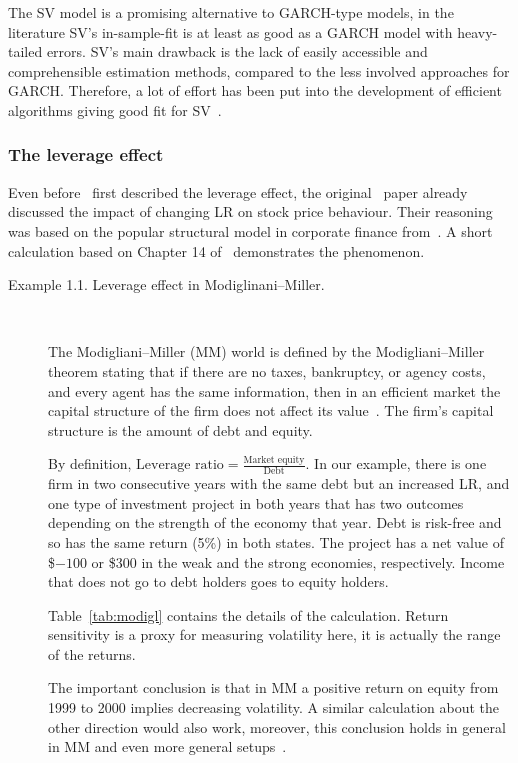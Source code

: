 The SV model is a promising alternative to GARCH-type models, in the literature SV's in-sample-fit is at least as good as a GARCH model with heavy-tailed errors.
SV's main drawback is the lack of easily accessible and comprehensible estimation methods, compared to the less involved approaches for GARCH.
Therefore, a lot of effort has been put into the development of efficient algorithms giving good fit for SV~\citep{Kim1998,jacquier2002bayesian,Omori2007,Kastner2014,Chan2016}.

\subsubsection*{The leverage effect}

Even before~\citet{black1976studies} first described the leverage effect, the original~\citet{black1973pricing} paper already discussed the impact of changing LR on stock price behaviour.
Their reasoning was based on the popular structural model in corporate finance from~\citet{modigliani1958cost}.
A short calculation based on Chapter 14 of~\citet{berk2007corporate} demonstrates the phenomenon.
\begin{description}
	\item[Example 1.1. Leverage effect in Modiglinani--Miller.]~
	
	The Modigliani--Miller (MM) world is defined by the Modigliani--Miller theorem stating that if there are no taxes, bankruptcy, or agency costs, and every agent has the same information, then in an efficient market the capital structure of the firm does not affect its value~\citep{modigliani1958cost}.
	The firm's capital structure is the amount of debt and equity.
	
	By definition, $\text{Leverage ratio}=\frac{\text{Market equity}}{\text{Debt}}$. In our example, there is one firm in two consecutive years with the same debt but an increased LR, and one type of investment project in both years that has two outcomes depending on the strength of the economy that year.
	Debt is risk-free and so has the same return (5\%) in both states.
	The project has a net value of \$$-100$ or \$$300$ in the weak and the strong economies, respectively.
	Income that does not go to debt holders goes to equity holders.
	
	Table~\ref{tab:modigl} contains the details of the calculation. Return sensitivity is a proxy for measuring volatility here, it is actually the range of the returns.
	
	The important conclusion is that in MM a positive return on equity from 1999 to 2000 implies decreasing volatility.
	A similar calculation about the other direction would also work, moreover, this conclusion holds in general in MM and even more general setups~\citep{Christie1982}.
\end{description}

